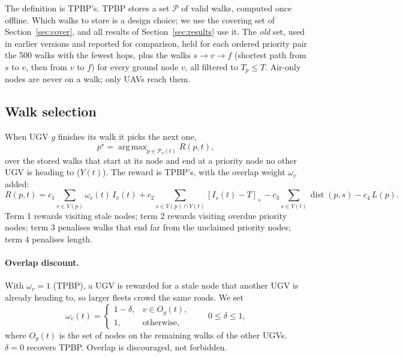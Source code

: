 \documentclass[11pt]{article}
\DeclareMathOperator*{\argmax}{arg\,max}
\DeclareMathOperator{\dist}{dist}
\newcommand{\pos}[1]{[#1]_+}
\theoremstyle{definition}
\theoremstyle{plain}
\begin{document}
The definition is TPBP's. TPBP stores a set $\mathcal{P}$ of valid walks,
computed once offline. Which walks to store is a design choice; we
use the covering set of Section~\ref{sec:cover}, and all results of
Section~\ref{sec:results} use it. The \emph{old} set, used in earlier
versions and reported for comparison, held for each ordered priority pair
the 500 walks with the fewest hops, plus the walks $s \to v \to f$
(shortest path from $s$ to $v$, then from $v$ to $f$) for every ground node
$v$, all filtered to $T_p \leq T$. Air-only
nodes are never on a walk; only UAVs reach them.

\subsection{Walk selection}
\label{sec:select}

When UGV $g$ finishes its walk it picks the next one,
\begin{equation}
p^\star = \argmax_{p \in \mathcal{P}_o(t)} R(p, t),
\end{equation}
over the stored walks that start at its node and end at a priority node no
other UGV is heading to ($Y(t)$). The reward is TPBP's, with the overlap
weight $\omega_v$ added:
\begin{equation}
R(p, t) = c_1 \sum_{v \in V(p)} \omega_v(t)\, I_v(t)
+ c_2 \sum_{s \in V(p) \cap Y(t)} \pos{I_s(t) - T}
- c_3 \sum_{s \in Y(t)} \dist(p, s)
- c_4\, L(p) .
\label{eq:R}
\end{equation}
Term 1 rewards visiting stale nodes; term 2 rewards visiting overdue
priority nodes; term 3 penalises walks that end far from the unclaimed
priority nodes; term 4 penalises length.

\paragraph{Overlap discount.} With $\omega_v = 1$ (TPBP), a UGV is rewarded
for a stale node that another UGV is already heading to, so larger fleets
crowd the same roads. We set
\begin{equation}
\omega_v(t) = \begin{cases} 1 - \delta, & v \in O_g(t), \\ 1, &
\text{otherwise,} \end{cases} \qquad 0 \leq \delta \leq 1,
\end{equation}
where $O_g(t)$ is the set of nodes on the remaining walks of the other
UGVs. $\delta = 0$ recovers TPBP. Overlap is discouraged, not forbidden.
\end{document}
